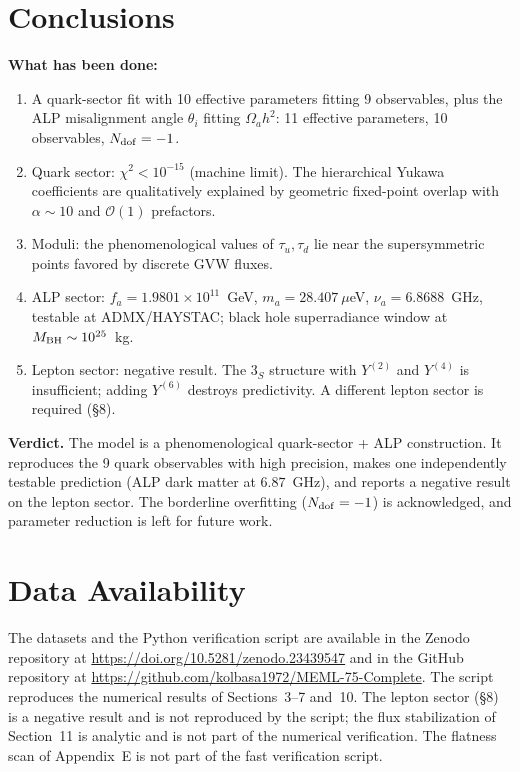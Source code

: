 \documentclass[12pt,a4paper]{article}
\numberwithin{equation}{section}
\begin{document}
\section{Conclusions}
\textbf{What has been done:}
\begin{enumerate}[leftmargin=1.5em]
\item A quark-sector fit with 10 effective parameters fitting
9 observables, plus the ALP misalignment angle \(\theta_i\) fitting
\(\Omega_a h^2\): 11 effective parameters, 10 observables,
\(N_{\rm dof} = -1\).
\item Quark sector: \(\chi^2 < 10^{-15}\) (machine limit). The
hierarchical Yukawa coefficients are qualitatively explained by
geometric fixed-point overlap with \(\alpha \sim 10\) and
\(\mathcal{O}(1)\) prefactors.
\item Moduli: the phenomenological values of \(\tau_u,\tau_d\) lie near
the supersymmetric points favored by discrete GVW fluxes.
\item ALP sector: \(f_a = 1.9801\times10^{11}\)~GeV,
\(m_a = 28.407~\mu\)eV, \(\nu_a = 6.8688\)~GHz, testable at
ADMX/HAYSTAC; black hole superradiance window at
\(M_{\rm BH} \sim 10^{25}\)~kg.
\item Lepton sector: negative result. The \(3_S\) structure with
\(Y^{(2)}\) and \(Y^{(4)}\) is insufficient; adding \(Y^{(6)}\)
destroys predictivity. A different lepton sector is required (\S8).
\end{enumerate}

\textbf{Verdict.} The model is a phenomenological quark-sector + ALP
construction. It reproduces the 9 quark observables with high precision,
makes one independently testable prediction (ALP dark matter at
\(6.87\)~GHz), and reports a negative result on the lepton sector.
The borderline overfitting (\(N_{\rm dof}=-1\)) is acknowledged, and
parameter reduction is left for future work.

\section*{Data Availability}
The datasets and the Python verification script are available in the
Zenodo repository at \url{https://doi.org/10.5281/zenodo.23439547} %
and in the GitHub repository at
\url{https://github.com/kolbasa1972/MEML-75-Complete}.
The script reproduces the numerical results of Sections~3--7 and~10.
The lepton sector (\S8) is a negative result and is not reproduced by
the script; the flux stabilization of Section~11 is analytic and is
not part of the numerical verification. The flatness scan of
Appendix~E is not part of the fast verification script.
\end{document}
